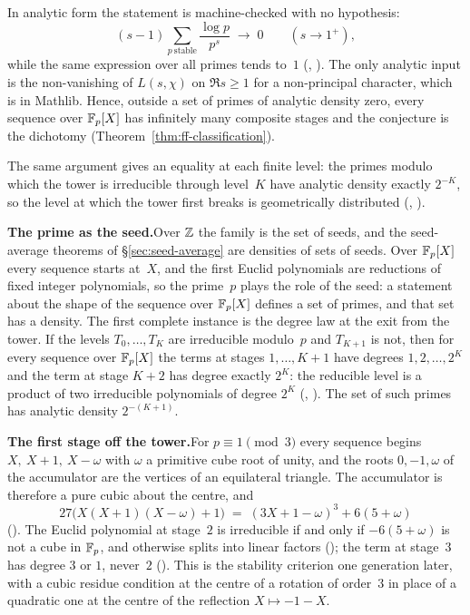 In analytic form the statement is machine-checked with no hypothesis:
\[
  (s-1)\sum_{p\ \mathrm{stable}}\frac{\log p}{p^{s}}\;\longrightarrow\;0
  \qquad (s\to 1^+),
\]
while the same expression over all primes tends to~$1$
(,
).
The only analytic input is the non-vanishing of $L(s,\chi)$ on
$\Re s\ge 1$ for a non-principal character, which is in Mathlib.  Hence,
outside a set of primes of analytic density zero, every sequence over
$\mathbb{F}_p[X]$ has infinitely many composite stages and the conjecture is
the dichotomy (Theorem~\ref{thm:ff-classification}).

The same argument gives an equality at each finite level: the primes
modulo which the tower is irreducible through level~$K$ have analytic
density exactly $2^{-K}$, so the level at which the tower first breaks
is geometrically distributed
(,
).

\smallskip\noindent\textbf{The prime as the seed.}\enspace Over $\mathbb{Z}$ the
family is the set of seeds, and the seed-average theorems of
\S\ref{sec:seed-average} are densities of sets of seeds.  Over $\mathbb{F}_p[X]$
every sequence starts at~$X$, and the first Euclid polynomials are
reductions of fixed integer polynomials, so the prime~$p$ plays the role of
the seed: a statement about the shape of the sequence over $\mathbb{F}_p[X]$
defines a set of primes, and that set has a density.  The first complete
instance is the degree law at the exit from the tower.  If the levels
$T_0,\dots,T_K$ are irreducible modulo~$p$ and $T_{K+1}$ is not, then for
every sequence over $\mathbb{F}_p[X]$ the terms at stages $1,\dots,K+1$ have
degrees $1,2,\dots,2^K$ and the term at stage $K+2$ has degree exactly
$2^K$: the reducible level is a product of two irreducible polynomials of
degree $2^K$
(,
).  The set of
such primes has analytic density $2^{-(K+1)}$.

\smallskip\noindent\textbf{The first stage off the tower.}\enspace For
$p\equiv 1\pmod 3$ every sequence begins $X,\ X+1,\ X-\omega$ with
$\omega$ a primitive cube root of unity, and the roots $0,-1,\omega$ of
the accumulator are the vertices of an equilateral triangle.  The
accumulator is therefore a pure cubic about the centre, and
\[
  27\bigl(X(X+1)(X-\omega)+1\bigr) \;=\; (3X+1-\omega)^3 + 6(5+\omega)
\]
().  The
Euclid polynomial at stage~$2$ is irreducible if and only if
$-6(5+\omega)$ is not a cube in $\mathbb{F}_p$, and otherwise splits into
linear factors
();
the term at stage~$3$ has degree $3$ or $1$, never~$2$
().
This is the stability criterion one generation later, with a cubic
residue condition at the centre of a rotation of order~$3$ in place of a
quadratic one at the centre of the reflection $X\mapsto -1-X$.

